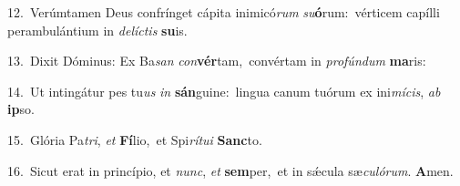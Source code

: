 {\numbfont\textcolor{\numbcolor}{12.}}~Verúmtamen Deus confrínget cápita inimicó\textit{rum} \textit{su}\-\textbf{ó}rum:~\star vérticem capílli perambulántium in \textit{de}\-\textit{líc}\textit{tis} \textbf{su}\-is.\par
{\numbfont\textcolor{\numbcolor}{13.}}~Dixit Dóminus: Ex Ba\textit{san} \textit{con}\-\textbf{vér}tam,~\star convértam in \textit{pro}\-\textit{fún}\textit{dum} \textbf{ma}\-ris:\par
{\numbfont\textcolor{\numbcolor}{14.}}~Ut intingátur pes tu\textit{us} \textit{in} \textbf{sán}\-guine:~\star lingua canum tuórum ex ini\-\textit{mí}\-\textit{cis}, \textit{ab} \textbf{ip}\-so.\par
{\numbfont\textcolor{\numbcolor}{15.}}~Glória Pa\-\textit{tri}\-, \textit{et} \textbf{Fí}\-lio,~\star et Spi\-\textit{rí}\-\textit{tu}\textit{i} \textbf{Sanc}\-to.\par
{\numbfont\textcolor{\numbcolor}{16.}}~Sicut erat in princípio, et \textit{nunc}\-, \textit{et} \textbf{sem}\-per,~\star et in sǽcula sæ\-\textit{cu}\-\textit{ló}\textit{rum}. \textbf{A}\-men.\par
